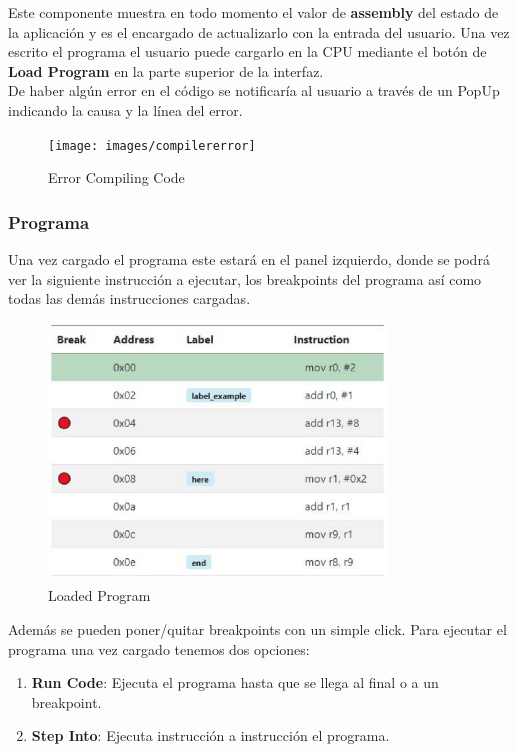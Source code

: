 {{            Este componente muestra en todo momento el valor de \textbf{assembly} del estado de la aplicación y es el encargado de actualizarlo con la entrada del usuario.
            Una vez escrito el programa el usuario puede cargarlo en la CPU mediante el botón de \textbf{Load Program} en la parte superior de la interfaz. \\

            De haber algún error en el código se notificaría al usuario a través de un PopUp indicando la causa y la línea del error.

            \begin{figure}[h]
                \centering
                \texttt{[image: images/compilererror]}
                \caption{Error Compiling Code}
            \end{figure}
            \clearpage
        }
        
        \subsubsection{Programa}
        {
            Una vez cargado el programa este estará en el panel izquierdo, donde se podrá ver la siguiente instrucción a ejecutar,
            los breakpoints del programa así como todas las demás instrucciones cargadas. \\
            
            \begin{figure}[h]
                \centering
                \includegraphics[width=0.8\textwidth, height=0.35\textheight]{images/programa}
                \caption{Loaded Program}
            \end{figure}
            
            Además se pueden poner/quitar breakpoints con un simple click. Para ejecutar el programa una vez cargado tenemos dos opciones:
            \begin{enumerate}
                \item \textbf{Run Code}: Ejecuta el programa hasta que se llega al final o a un breakpoint.
                \item \textbf{Step Into}: Ejecuta instrucción a instrucción el programa.
            \end{enumerate}
        }

}
